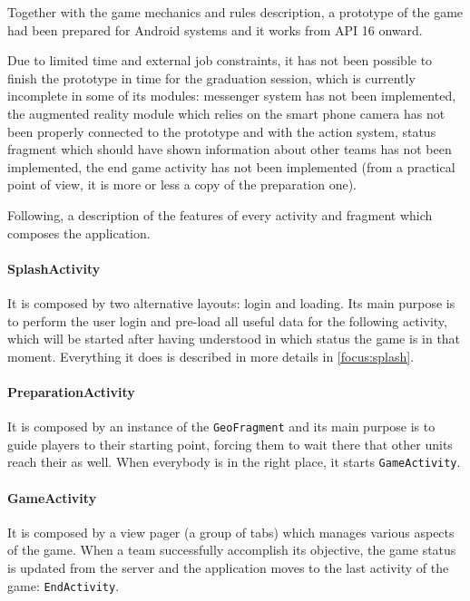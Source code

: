 		Together with the game mechanics and rules description, a prototype of the game had been prepared for Android systems and it works from API 16 onward.
			
		Due to limited time and external job constraints, it has not been possible to finish the prototype in time for the graduation session, which is currently incomplete in some of its modules: messenger system has not been implemented, the augmented reality module which relies on the smart phone camera has not been properly connected to the prototype and with the action system, status fragment which should have shown information about other teams has not been implemented, the end game activity has not been implemented (from a practical point of view, it is more or less a copy of the preparation one).
		
		Following, a description of the features of every activity and fragment which composes the application.
		
		\paragraph{SplashActivity}
		
		It is composed by two alternative layouts: login and loading.
		Its main purpose is to perform the user login and pre-load all useful data for the following activity, which will be started after having understood in which status the game is in that moment.
		Everything it does is described in more details in \autoref{focus:splash}.
		
		\paragraph{PreparationActivity}
		
		It is composed by an instance of the \lstinline|GeoFragment| and its main purpose is to guide players to their starting point, forcing them to wait there that other units reach their as well. When everybody is in the right place, it starts \lstinline|GameActivity|.
		
		\paragraph{GameActivity}
			
		It is composed by a view pager (a group of tabs) which manages various aspects of the game.
		When a team successfully accomplish its objective, the game status is updated from the server and the application moves to the last activity of the game: \lstinline|EndActivity|.
		
